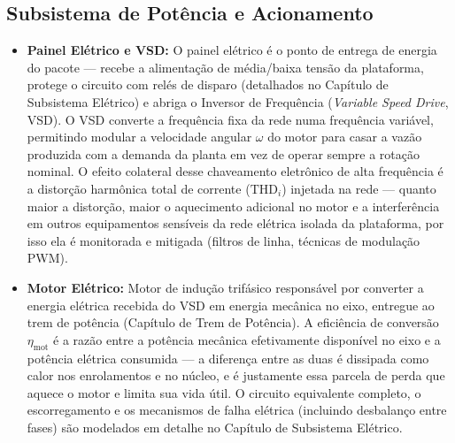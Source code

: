 \documentclass[12pt,a4paper]{article}
\numberwithin{equation}{section}
\numberwithin{table}{section}
\numberwithin{figure}{section}
\begin{document}
{	\subsection{\textbf{Subsistema de Potência e Acionamento}}
	\begin{itemize}
		\item \textbf{Painel Elétrico e VSD:} O painel elétrico é o ponto de entrega de energia do pacote — recebe a alimentação de média/baixa tensão da plataforma, protege o circuito com relés de disparo (detalhados no Capítulo de Subsistema Elétrico) e abriga o Inversor de Frequência (\textit{Variable Speed Drive}, VSD). O VSD converte a frequência fixa da rede numa frequência variável, permitindo modular a velocidade angular $\omega$ do motor para casar a vazão produzida com a demanda da planta em vez de operar sempre a rotação nominal. O efeito colateral desse chaveamento eletrônico de alta frequência é a distorção harmônica total de corrente ($\text{THD}_i$) injetada na rede — quanto maior a distorção, maior o aquecimento adicional no motor e a interferência em outros equipamentos sensíveis da rede elétrica isolada da plataforma, por isso ela é monitorada e mitigada (filtros de linha, técnicas de modulação PWM).
		\item \textbf{Motor Elétrico:} Motor de indução trifásico responsável por converter a energia elétrica recebida do VSD em energia mecânica no eixo, entregue ao trem de potência (Capítulo de Trem de Potência). A eficiência de conversão $\eta_{\text{mot}}$ é a razão entre a potência mecânica efetivamente disponível no eixo e a potência elétrica consumida — a diferença entre as duas é dissipada como calor nos enrolamentos e no núcleo, e é justamente essa parcela de perda que aquece o motor e limita sua vida útil. O circuito equivalente completo, o escorregamento e os mecanismos de falha elétrica (incluindo desbalanço entre fases) são modelados em detalhe no Capítulo de Subsistema Elétrico.
	\end{itemize}
	
}
\end{document}
